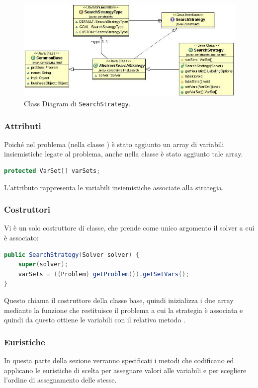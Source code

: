 \begin{figure}[!ht]\label{searchstrategyUML}
\centering
\includegraphics[scale=.5]{img/SearchStrategy.JPG}
\caption{Class Diagram di \texttt{SearchStrategy}.}
\end{figure}

\subsubsection{Attributi}
Poiché nel problema (nella classe ) è stato aggiunto 
un array di variabili insiemistiche legate al problema, anche nella classe 
è stato aggiunto tale array.
\begin{lstlisting}[language = Java, frame = single]
    protected VarSet[] varSets;
\end{lstlisting}
L'attributo  rappresenta le variabili insiemistiche associate 
alla strategia.

\subsubsection{Costruttori}
Vi è un solo costruttore di classe, che prende come unico argomento il
solver a cui è associato:
\begin{lstlisting}[language = Java, frame = single]
public SearchStrategy(Solver solver) {
	super(solver);
	varSets = ((Problem) getProblem()).getSetVars();
}
\end{lstlisting}
Questo chiama il costruttore della classe base, quindi inizializza i due
array mediante la funzione  che restituisce il problema a 
cui la strategia è associata e quindi da questo ottiene le variabili con
il relativo metodo .

\subsubsection{Euristiche}
In questa parte della sezione verranno specificati i metodi che codificano
ed applicano le euristiche di scelta per assegnare valori alle variabili
e per scegliere l'ordine di assegnamento delle stesse.


